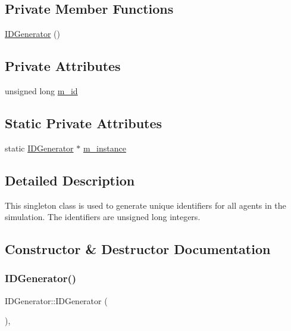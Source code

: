 \subsection*{Private Member Functions}
\begin{DoxyCompactItemize}
\item 
\hyperlink{class_i_d_generator_a8209b55f50b469c47f977660a769b1da}{I\+D\+Generator} ()
\end{DoxyCompactItemize}
\subsection*{Private Attributes}
\begin{DoxyCompactItemize}
\item 
unsigned long \hyperlink{class_i_d_generator_ad0400380525f694b23ff675f4f170893}{m\+\_\+id}
\end{DoxyCompactItemize}
\subsection*{Static Private Attributes}
\begin{DoxyCompactItemize}
\item 
static \hyperlink{class_i_d_generator}{I\+D\+Generator} $\ast$ \hyperlink{class_i_d_generator_a316bacdda67f4cf9bf73fcbd9bf94245}{m\+\_\+instance}
\end{DoxyCompactItemize}


\subsection{Detailed Description}
This singleton class is used to generate unique identifiers for all agents in the simulation. The identifiers are unsigned long integers. 

\subsection{Constructor \& Destructor Documentation}
\mbox{\label{class_i_d_generator_a8209b55f50b469c47f977660a769b1da}} 
\subsubsection{\texorpdfstring{I\+D\+Generator()}{IDGenerator()}}
{\footnotesize\ttfamily I\+D\+Generator\+::\+I\+D\+Generator (\begin{DoxyParamCaption}{ }\end{DoxyParamCaption})\hspace{0.3cm}{\ttfamily [inline]}, {\ttfamily [private]}}

